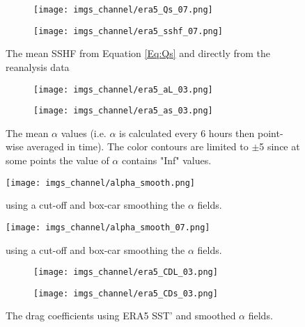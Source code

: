 \documentclass[12pt,a4paper]{article}
\begin{document}
\begin{figure}[h!]
\centering
\begin{subfigure}[t]{0.49\textwidth}
\texttt{[image: imgs\_channel/era5\_Qs\_07.png]}
\end{subfigure}
\begin{subfigure}[t]{0.49\textwidth}
\texttt{[image: imgs\_channel/era5\_sshf\_07.png]}
\end{subfigure}
\caption{The mean SSHF from Equation \ref{Eq:Qs} and directly from the reanalysis data}
\end{figure}


\begin{figure}[h!]
\centering
\begin{subfigure}[t]{0.49\textwidth}
\texttt{[image: imgs\_channel/era5\_aL\_03.png]}
\end{subfigure}
\begin{subfigure}[t]{0.49\textwidth}
\texttt{[image: imgs\_channel/era5\_as\_03.png]}
\end{subfigure}
\caption{The mean $\alpha$ values (i.e. $\alpha$ is calculated every 6 hours then point-wise averaged in time). The color contours are limited to $\pm$5 since at some points the value of $\alpha$ contains "Inf" values. }
\end{figure}

\begin{figure}[h!]
\centering
\texttt{[image: imgs\_channel/alpha\_smooth.png]}
\caption{using a cut-off and box-car smoothing the $\alpha$ fields.}
\end{figure}

\begin{figure}[h!]
\centering
\texttt{[image: imgs\_channel/alpha\_smooth\_07.png]}
\caption{using a cut-off and box-car smoothing the $\alpha$ fields.}
\end{figure}


\begin{figure}[h!]
\centering
\begin{subfigure}[t]{0.49\textwidth}
\texttt{[image: imgs\_channel/era5\_CDL\_03.png]}
\end{subfigure}
\begin{subfigure}[t]{0.49\textwidth}
\texttt{[image: imgs\_channel/era5\_CDs\_03.png]}
\end{subfigure}
\caption{The drag coefficients using ERA5 SST' and smoothed $\alpha$ fields.}
\end{figure}
\end{document}
